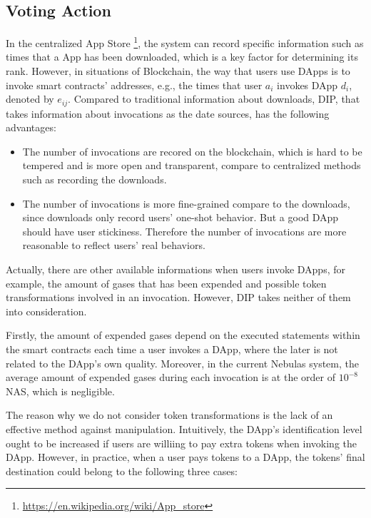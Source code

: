  \subsection{Voting Action}
 \label{subsection:voting}
  In the centralized App Store \footnote{\url{https://en.wikipedia.org/wiki/App\_store}}, the system can record specific information such as times that a App has been downloaded, which is a key factor for determining its rank. However, in situations of Blockchain, the way that users use DApps is to invoke smart contracts' addresses, e.g., the times that user $a_i$ invokes DApp $d_i$, denoted by  $e_{ij}$. Compared to traditional information about downloads, DIP, that takes information about invocations as the date sources, has the following advantages:
  
 \begin{itemize}
 	\item The number of invocations are recored on the blockchain, which is hard to be tempered and is more open and transparent, compare to centralized methods such as recording the downloads.
 	\item The number of invocations is more fine-grained compare to the downloads, since downloads only record users' one-shot behavior. But a good DApp should have user stickiness. Therefore the number of invocations are more reasonable to reflect users' real behaviors. 
 	
\end{itemize}
  
 Actually, there are other available informations when users invoke DApps, for example, the amount of gases that has been expended and possible token transformations involved in an invocation. However, DIP takes neither of them into consideration. 
 
 Firstly, the amount of expended gases depend on the executed statements within the smart contracts each time a user invokes a DApp, where the later is not related to the DApp's own quality. Moreover, in the current Nebulas system, the average amount of expended gases during each invocation is at the order of $10^{-8}$ NAS, which is negligible. 
 
 The reason why we do not consider token transformations is the lack of an effective method against manipulation. Intuitively, the DApp's {\color{red} identification level} ought to be increased if users are williing to pay extra tokens when invoking the DApp. 
  However, in practice, when a user pays tokens to a DApp, the tokens' final destination could belong to the following three cases:
  
